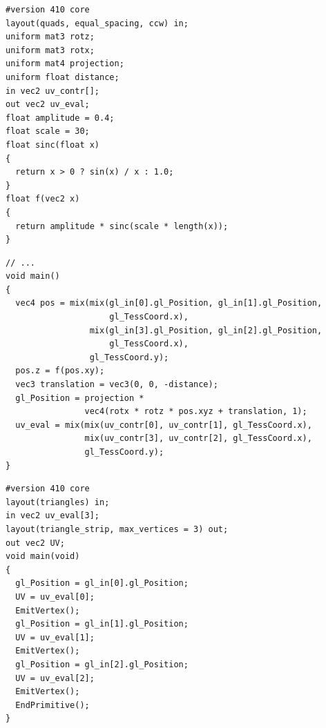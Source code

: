 \documentclass[calcdimensions,landscape,letterpaper]{powersem}
\newcommand{\thecurrentheading}{}
\newcommand{\heading}[1]{\renewcommand{\thecurrentheading}{#1}}
\begin{document}
\begin{slide}
    \heading{Tessellation: Tessellation Evaluation Shader}
    \begin{center}
        \begin{minipage}[c]{.95\textwidth}
            \begin{verbatim}
#version 410 core
layout(quads, equal_spacing, ccw) in;
uniform mat3 rotz;
uniform mat3 rotx;
uniform mat4 projection;
uniform float distance;
in vec2 uv_contr[];
out vec2 uv_eval;
float amplitude = 0.4;
float scale = 30;
float sinc(float x)
{
  return x > 0 ? sin(x) / x : 1.0;
}
float f(vec2 x)
{
  return amplitude * sinc(scale * length(x));
}
            \end{verbatim}
        \end{minipage}
    \end{center}
\end{slide}

\begin{slide}
    \heading{Tessellation: Tessellation Evaluation Shader}
    \begin{center}
        \begin{minipage}[c]{.95\textwidth}
            \begin{verbatim}
// ...
void main()
{
  vec4 pos = mix(mix(gl_in[0].gl_Position, gl_in[1].gl_Position,
                     gl_TessCoord.x),
                 mix(gl_in[3].gl_Position, gl_in[2].gl_Position,
                     gl_TessCoord.x),
                 gl_TessCoord.y);
  pos.z = f(pos.xy);
  vec3 translation = vec3(0, 0, -distance);
  gl_Position = projection *
                vec4(rotx * rotz * pos.xyz + translation, 1);
  uv_eval = mix(mix(uv_contr[0], uv_contr[1], gl_TessCoord.x),
                mix(uv_contr[3], uv_contr[2], gl_TessCoord.x),
                gl_TessCoord.y);
}
            \end{verbatim}
        \end{minipage}
    \end{center}
\end{slide}

\begin{slide}
    \heading{Tessellation: Geometry Shader}
    \begin{center}
        \begin{minipage}[c]{.95\textwidth}
            \begin{verbatim}
#version 410 core
layout(triangles) in;
in vec2 uv_eval[3];
layout(triangle_strip, max_vertices = 3) out;
out vec2 UV;
void main(void)
{
  gl_Position = gl_in[0].gl_Position;
  UV = uv_eval[0];
  EmitVertex();
  gl_Position = gl_in[1].gl_Position;
  UV = uv_eval[1];
  EmitVertex();
  gl_Position = gl_in[2].gl_Position;
  UV = uv_eval[2];
  EmitVertex();
  EndPrimitive();
}
            \end{verbatim}
        \end{minipage}
    \end{center}
\end{slide}
\end{document}
